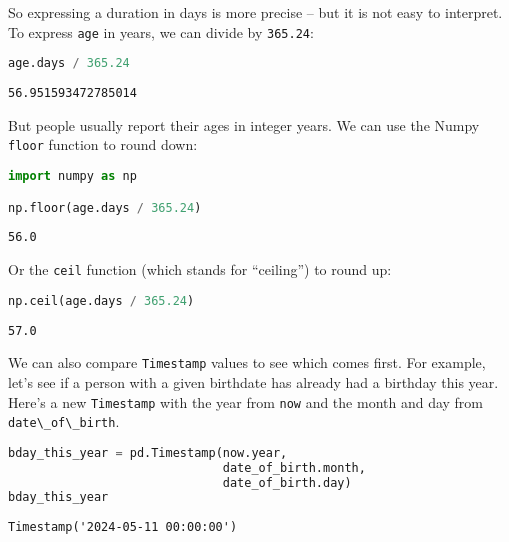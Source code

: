 So expressing a duration in days is more precise -- but it is not easy
to interpret. To express \passthrough{\lstinline!age!} in years, we can
divide by \passthrough{\lstinline!365.24!}:

\begin{lstlisting}[language=Python,style=source]
age.days / 365.24
\end{lstlisting}

\begin{lstlisting}[style=output]
56.951593472785014
\end{lstlisting}

But people usually report their ages in integer years. We can use the
Numpy \passthrough{\lstinline!floor!} function to round down:

\begin{lstlisting}[language=Python,style=source]
import numpy as np

np.floor(age.days / 365.24)
\end{lstlisting}

\begin{lstlisting}[style=output]
56.0
\end{lstlisting}

Or the \passthrough{\lstinline!ceil!} function (which stands for
``ceiling'') to round up:

\begin{lstlisting}[language=Python,style=source]
np.ceil(age.days / 365.24)
\end{lstlisting}

\begin{lstlisting}[style=output]
57.0
\end{lstlisting}

We can also compare \passthrough{\lstinline!Timestamp!} values to see
which comes first. For example, let's see if a person with a given
birthdate has already had a birthday this year. Here's a new
\passthrough{\lstinline!Timestamp!} with the year from
\passthrough{\lstinline!now!} and the month and day from
\passthrough{\lstinline!date\_of\_birth!}.

\begin{lstlisting}[language=Python,style=source]
bday_this_year = pd.Timestamp(now.year, 
                              date_of_birth.month, 
                              date_of_birth.day)
bday_this_year
\end{lstlisting}

\begin{lstlisting}[style=output]
Timestamp('2024-05-11 00:00:00')
\end{lstlisting}

